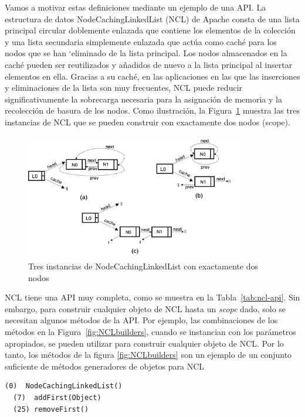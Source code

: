 Vamos a motivar estas definiciones mediante un ejemplo de una API. La estructura de datos NodeCachingLinkedList (NCL) de Apache \cite{apache} consta de una lista principal circular doblemente enlazada que contiene los elementos de la colección y una lista secundaria simplemente enlazada que actúa como caché para los nodos que se han `eliminado de la lista principal. Los nodos almacenados en la caché pueden ser reutilizados y añadidos de nuevo a la lista principal al insertar elementos en ella. Gracias a su caché, en las aplicaciones en las que las inserciones y eliminaciones de la lista son muy frecuentes, NCL puede reducir significativamente la sobrecarga necesaria para la asignación de memoria y la recolección de basura de los nodos. 
Como ilustración, la Figura~\ref{fig:ncl-instances} muestra las tres instancias de NCL que se pueden construir con exactamente dos nodos (scope).

\begin{figure}[H]
    \centering
    \includegraphics[width=0.85\textwidth]{images/NCL-instances.png}
    \caption{Tres instancias de NodeCachingLinkedList con exactamente dos nodos}
    \label{fig:ncl-instances}
\end{figure}


NCL tiene una API muy completa, como se muestra en la Tabla~\ref{tab:ncl-api}.
Sin embargo, para construir cualquier objeto de NCL hasta un \emph{scope} dado, solo se necesitan algunos métodos de la API. Por ejemplo, las combinaciones de los métodos en la Figura~\ref{fig:NCLbuilders}, cuando se instancian con los parámetros
apropiados, se pueden utilizar para construir cualquier objeto de NCL.
Por lo tanto, los métodos de la figura \ref{fig:NCLbuilders} son un ejemplo de un conjunto suficiente de métodos generadores de objetos para NCL
\\
\begin{lstlisting}[numbers=none,label=fig:NCLbuilders, caption=Conjunto de metodos sufiente para NCL]
  (0)  NodeCachingLinkedList()
  (7)  addFirst(Object)
  (25) removeFirst()
\end{lstlisting}

